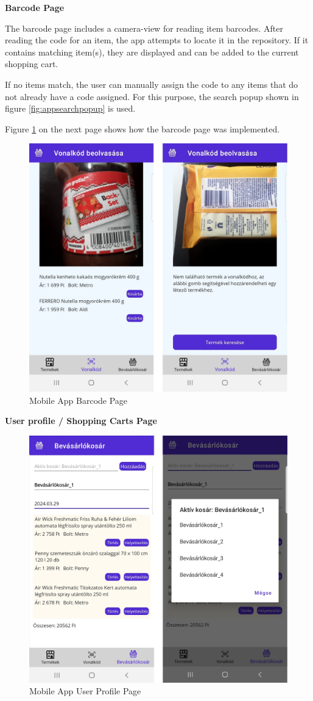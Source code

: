\noindent\textbf{Barcode Page}

The barcode page includes a camera-view for reading item barcodes. After reading the code for an item, the app attempts to locate it in the repository. If it contains matching item(s), they are displayed and can be added to the current shopping cart. 

If no items match, the user can manually assign the code to any items that do not already have a code assigned. For this purpose, the search popup shown in figure \ref{fig:appsearchpopup} is used.

Figure \ref{fig:appbarcodepage} on the next page shows how the barcode page was implemented.

\begin{figure}[H]
	\centering
	\includegraphics[width=0.6\linewidth]{img/app_barcodepage.png}
	\caption{Mobile App Barcode Page}
	\label{fig:appbarcodepage}
\end{figure}

\noindent\textbf{User profile / Shopping Carts Page}

\begin{figure}[H]
	\centering
	\includegraphics[width=0.6\linewidth]{img/app_shoppingcartpage.png}
	\caption{Mobile App User Profile Page}
	\label{fig:appshoppingcartspage}
\end{figure}

